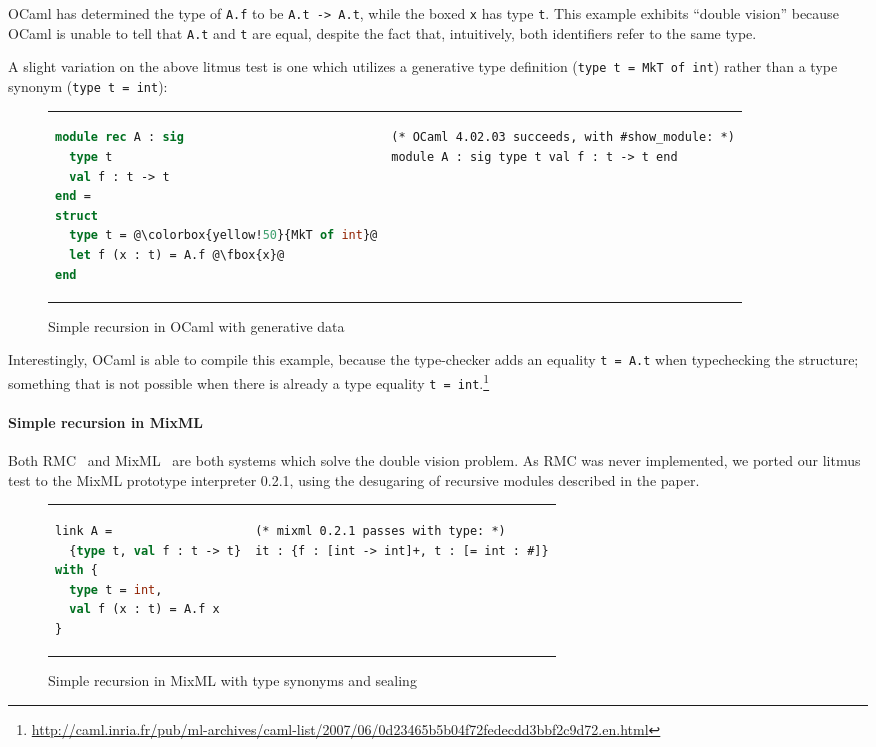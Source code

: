 \noindent
OCaml has determined the type of \verb|A.f| to be \verb|A.t -> A.t|,
while the boxed \verb|x| has type \verb|t|.  This example exhibits
``double vision'' because OCaml is unable to tell that \verb|A.t| and
\verb|t| are equal, despite the fact that, intuitively, both identifiers refer to
the same type.

A slight variation on the above litmus test is one which utilizes a generative type
definition (\verb|type t = MkT of int|) rather than a type synonym (\verb|type t = int|):

\begin{figure}[H]
\begin{tabular}{p{} p{}}
\begin{lstlisting}[language=ML,escapechar=@]
module rec A : sig
  type t
  val f : t -> t
end =
struct
  type t = @\colorbox{yellow!50}{MkT of int}@
  let f (x : t) = A.f @\fbox{x}@
end
\end{lstlisting}
&
\begin{verbatim}
(* OCaml 4.02.03 succeeds, with #show_module: *)
module A : sig type t val f : t -> t end
\end{verbatim}
\end{tabular}
\caption{Simple recursion in OCaml with generative data}
\label{fig:double-vision-simple-recursion-ocaml-generative}
\end{figure}

\noindent
Interestingly, OCaml is able to compile this example, because the type-checker
adds an equality \verb|t = A.t| when typechecking the structure; something that
is not possible when there is already a type equality \verb|t = int|.\footnote{\url{http://caml.inria.fr/pub/ml-archives/caml-list/2007/06/0d23465b5b04f72fedecdd3bbf2c9d72.en.html}}

\paragraph{Simple recursion in MixML}
Both RMC~\cite{dreyer:recursive} and MixML~\cite{rossberg+:mixml} are
both systems which solve the double vision problem.  As RMC was never
implemented, we ported our
litmus test to the MixML prototype interpreter 0.2.1, using the
desugaring of recursive modules described in the paper.

\begin{figure}[H]
\begin{tabular}{p{} p{}}
\begin{lstlisting}[language=ML,escapechar=@]
link A =
  {type t, val f : t -> t}
with {
  type t = int,
  val f (x : t) = A.f x
}
\end{lstlisting}
&
\begin{verbatim}
(* mixml 0.2.1 passes with type: *)
it : {f : [int -> int]+, t : [= int : #]}
\end{verbatim}
\end{tabular}
\caption{Simple recursion in MixML with type synonyms and sealing}
\label{fig:double-vision-simple-recursion-mixml}
\end{figure}

